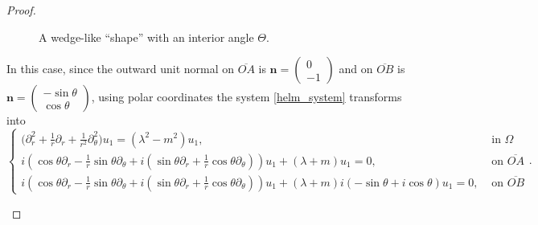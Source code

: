 \begin{proof}
\begin{enumerate}
\begin{figure}[H]
    \caption{A wedge-like ``shape'' with an interior angle \(\Theta\).}
    \label{wedge_dirac}
    \end{figure}
    In this case, since the outward unit normal on \(\overline{OA}\) is \(\mathbf{n} =\begin{pmatrix}
        0\\
        -1
    \end{pmatrix}\) and on \(\overline{OB}\) is \(\mathbf{n} =\begin{pmatrix}
        -\sin \theta\\
        \cos \theta
    \end{pmatrix}\), using polar coordinates the system \eqref{helm_system} transforms into
    \begin{equation}\label{helm_polar_wedge}
        \begin{cases}
            \Big(\partial_r^2 + \frac{1}{r}\partial_r +\frac{1}{r^2}\partial_\theta^2 \Big)u_1 = (\lambda^2 - m^2)u_1, & \text{ in } \Omega\\
             i (\cos \theta\partial_r -\frac{1}{r}\sin \theta \partial_\theta + i(\sin \theta\partial_r +\frac{1}{r}\cos \theta \partial_\theta))u_1 + (\lambda + m)u_1 = 0, & \text{ on } \overline{OA}\\
             i (\cos \theta\partial_r -\frac{1}{r}\sin \theta \partial_\theta + i(\sin \theta\partial_r +\frac{1}{r}\cos \theta \partial_\theta))u_1 + (\lambda + m)i(-\sin \theta + i \cos \theta)u_1 = 0, & \text{ on } \overline{OB}
        \end{cases}.
    \end{equation}


\end{enumerate}
\end{proof}
